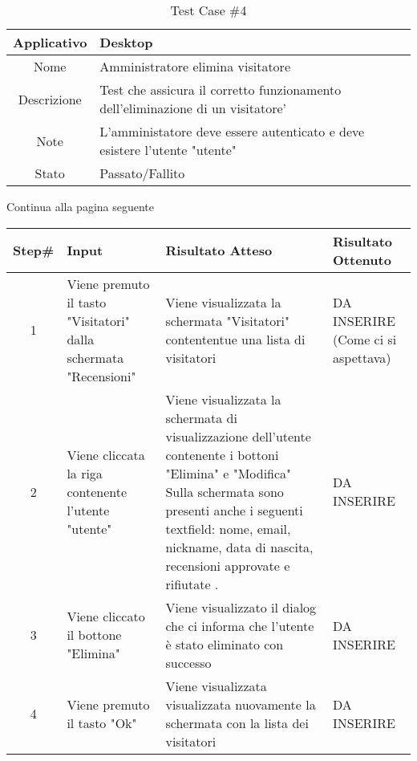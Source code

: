 
\begin{table}[H]
    \centering
    \footnotesize
    \caption{Test Case \#4}
    \begin{tabularx}{\textwidth}{|c|X|}
        \hline
        Applicativo & Desktop\\
        \hline
        Nome & Amministratore elimina visitatore  \\
        \hline
        Descrizione & Test che assicura il corretto funzionamento dell'eliminazione di un visitatore'\\
        \hline
        Note & L'amministatore deve essere autenticato e deve esistere l'utente "utente"  \\
        \hline
        Stato & Passato/Fallito\\
        \hline

    \end{tabularx}
    Continua alla pagina seguente
    \setlength{\tabcolsep}{8pt}
    \renewcommand{\arraystretch}{1.5}
\end{table}
\begin{table}[H]
    \footnotesize
    \begin{tabularx}{\textwidth}{|c|X|X|X|}
        \hline
        Step\# & Input & Risultato Atteso & Risultato Ottenuto \\
        \hline
         1 & Viene premuto il tasto "Visitatori" dalla schermata "Recensioni" 
         & Viene visualizzata la schermata "Visitatori" contententue una lista di visitatori
         &DA INSERIRE (Come ci si aspettava)\\
          \hline
        2 & Viene cliccata la riga contenente l'utente "utente"
        & Viene visualizzata la schermata di visualizzazione dell'utente contenente i bottoni "Elimina" e "Modifica"
          Sulla schermata sono presenti anche i seguenti textfield: nome, email, nickname, data di nascita, recensioni approvate e rifiutate .
        & DA INSERIRE\\
         \hline 
        3 & Viene cliccato il bottone "Elimina"
         & Viene visualizzato il dialog che ci informa che l'utente è stato eliminato con successo
         & DA INSERIRE\\
          \hline
          4 & Viene premuto il tasto "Ok"
         & Viene visualizzata visualizzata nuovamente la schermata con la lista dei visitatori
         & DA INSERIRE\\
          \hline      
    \end{tabularx}
\end{table}
    
       
